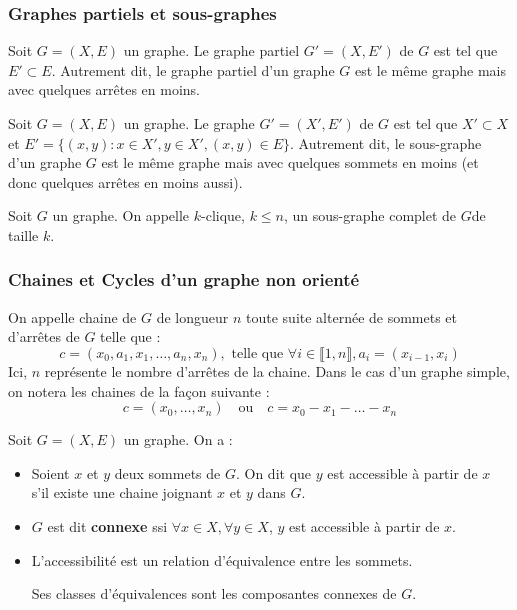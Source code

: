 \subsubsection{Graphes partiels et sous-graphes}

\begin{definition}
    Soit $G = (X,E)$ un graphe. Le graphe partiel $G' = (X,E')$ de $G$ est tel que $E' \subset E$.
    Autrement dit, le graphe partiel d'un graphe $G$ est le même graphe mais avec quelques arrêtes en moins.
\end{definition}

\begin{definition}
    Soit $G = (X,E)$ un graphe. Le graphe $G' = (X',E')$ de $G$ est tel que $X' \subset X$ et $E' = \{(x,y) : x \in X', y \in X', (x,y) \in E\}$.
    Autrement dit, le sous-graphe d'un graphe $G$ est le même graphe mais avec quelques sommets en moins (et donc quelques arrêtes en moins aussi).
\end{definition}

\begin{definition}[$k$-clique]
    Soit $G$ un graphe. On appelle $k$-clique, $k \leq n$, un sous-graphe complet de $G$de taille $k$.
\end{definition}


\subsubsection{Chaines et Cycles d'un graphe non orienté}

\begin{definition}[Chaine]
    On appelle chaine de $G$ de longueur $n$ toute suite alternée de sommets et d'arrêtes de $G$ telle que :
        \[ c = (x_0, a_1, x_1, \dots, a_n, x_n), \text{  telle que } \forall i \in \llbracket 1, n \rrbracket, a_i = (x_{i-1}, x_i) \]
    Ici, $n$ représente le nombre d'arrêtes de la chaine. Dans le cas d'un graphe simple, on notera les chaines de la façon suivante :
        \[ c = (x_0, \dots, x_n) \quad \text{ou} \quad c = x_0 - x_1 - \dots - x_n \] 
\end{definition}

\begin{definition}[Accessibilité]
    Soit $G = (X,E)$ un graphe. On a :
    \begin{itemize}
        \item Soient $x$ et $y$ deux sommets de $G$. On dit que $y$ est accessible à partir de $x$ s'il existe une chaine joignant $x$ et $y$ dans $G$.
        \item $G$ est dit \textbf{connexe} ssi $ \forall x \in X, \forall y \in X$, $y$ est accessible à partir de $x$.
        \item L'accessibilité est un relation d'équivalence entre les sommets. 
        
        Ses classes d'équivalences sont les composantes connexes de $G$.
    \end{itemize}
\end{definition}

